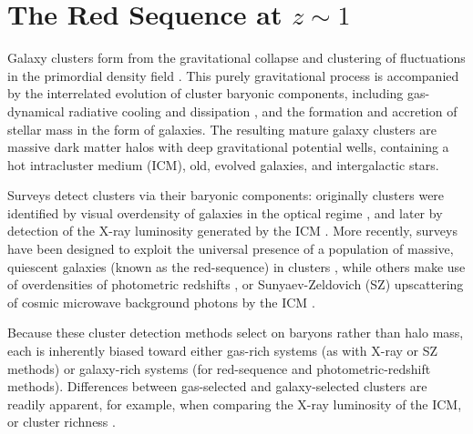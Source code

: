 \chapter{The Red Sequence at $z\sim1$}



Galaxy clusters form from the gravitational collapse and clustering of fluctuations in the primordial density field \citep{Press:1974aa,Gott:1975aa,Kravtsov:2012aa}.
This purely gravitational process is accompanied by the interrelated evolution of cluster baryonic components, including gas-dynamical radiative cooling and dissipation \citep{White:1978aa,Rudd:2008aa,Gnedin:2004aa,Kravtsov:2012aa}, and the formation and accretion of stellar mass in the form of galaxies. The resulting mature galaxy clusters are massive dark matter halos with deep gravitational potential wells, containing a hot intracluster medium (ICM), old, evolved galaxies, and intergalactic stars.

Surveys detect clusters via their baryonic components: originally clusters were identified by visual overdensity of galaxies in the optical regime \citep{Gunn:1986zm,Abell:1989lm,Lidman:1996uh,Ostrander:1998fx,Gal:2000lo}, and later by detection of the X-ray luminosity generated by the ICM \citep{Gioia:1994jm,Scharf:1997ws,Rosati:1998om,Romer:2000vp}. More recently, surveys have been designed to exploit the universal presence of a population of massive, quiescent galaxies (known as the red-sequence) in clusters \citep{Gladders:2000rq,Gladders:2005dp,Wilson:2009ws,Muzzin:2009jm,Rykoff:2014aa}, while others make use of overdensities of photometric redshifts \citep{Stanford:2005xr,Eisenhardt:2008pi}, or Sunyaev-Zeldovich (SZ) upscattering of cosmic microwave background photons by the ICM \citep{Reichardt:2013zn,Hasselfield:2013bs,Planck-Collaboration:2014aa,Bleem:2015sf}.

Because these cluster detection methods select on baryons rather than halo mass, each is inherently biased toward either gas-rich systems (as with X-ray or SZ methods) or galaxy-rich systems (for red-sequence and photometric-redshift methods).
Differences between gas-selected and galaxy-selected clusters are readily apparent, for example, when comparing the X-ray luminosity of the ICM, or cluster richness \citep{Donahue:2001fv,2008ApJ...675.1106R,Hicks:2013zl}.

